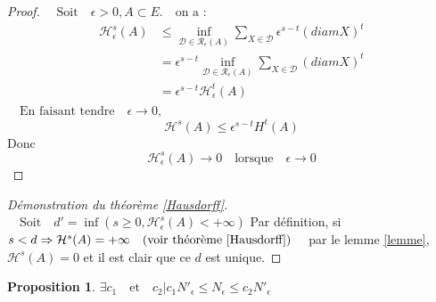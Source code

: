 \documentclass[12pt,a4paper]{article}
\theoremstyle{plain}
\theoremstyle{plain}
\newtheorem{proposition}[theo]{Proposition}
\theoremstyle{definition}
\theoremstyle{remark}
\newcommand{\textm}[1]{\quad \text{#1} \quad}
\begin{document}
\begin{proof}
$\textm{Soit} \epsilon > 0, A \subset E. \textm{on a :}$
\begin{equation*}\label{xx}
\begin{split}
\mathcal{H}^s_\epsilon (A)& \leq \inf_{\mathcal{D \in \mathcal{R}_\epsilon} (A)} \sum_{X \in \mathcal{D}} \epsilon ^{s-t} (diam X)^t \\
& = \epsilon^{s-t} \inf_{\mathcal{D \in \mathcal{R}_\epsilon} (A)} \sum_{X \in \mathcal{D}} (diam X)^t \\
& = \epsilon^{s-t} \mathcal{H}^t_\epsilon (A)
\end{split}
\end{equation*}
$\textm{En faisant tendre} \epsilon\rightarrow 0,$
\[\mathcal{H}^s (A) \leq \epsilon ^{s-t} H^t (A)\]
Donc \[\mathcal{H}^s _{\epsilon} (A) \rightarrow 0 \textm{lorsque} \epsilon \rightarrow 0\]
\end{proof}

\begin{proof}[Démonstration du théorème \ref{Hausdorff}]
$\textm{Soit} d' = \inf (s \geq 0, \mathcal{H}^s _\epsilon (A) < + \infty)$
Par définition, si $s<d \Rightarrow \mathcal{H}^s (A) = +\infty \textm {(voir théorème \ref{Hausdorff})}$
par le lemme \ref{lemme}, $\mathcal{H}^s(A)=0$ et il est clair que ce $d$ est unique.
\end{proof}

\begin{proposition}
$\exists c_{1} \textm{et} c_{2} | c_{1}N'_{\epsilon}\leq N_{\epsilon}\leq c_{2}N'_{\epsilon} $
\end{proposition}

\end{document}
